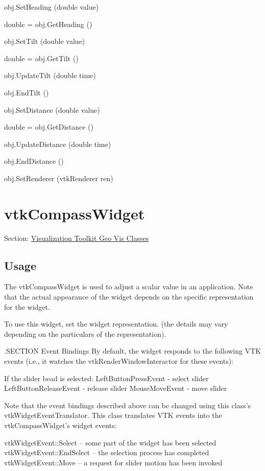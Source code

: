 \begin{DoxyItemize}
\item {\ttfamily obj.\-Set\-Heading (double value)}  
\item {\ttfamily double = obj.\-Get\-Heading ()}  
\item {\ttfamily obj.\-Set\-Tilt (double value)}  
\item {\ttfamily double = obj.\-Get\-Tilt ()}  
\item {\ttfamily obj.\-Update\-Tilt (double time)}  
\item {\ttfamily obj.\-End\-Tilt ()}  
\item {\ttfamily obj.\-Set\-Distance (double value)}  
\item {\ttfamily double = obj.\-Get\-Distance ()}  
\item {\ttfamily obj.\-Update\-Distance (double time)}  
\item {\ttfamily obj.\-End\-Distance ()}  
\item {\ttfamily obj.\-Set\-Renderer (vtk\-Renderer ren)}  
\end{DoxyItemize}\hypertarget{vtkgeovis_vtkcompasswidget}{}\section{vtk\-Compass\-Widget}\label{vtkgeovis_vtkcompasswidget}
Section\-: \hyperlink{sec_vtkgeovis}{Visualization Toolkit Geo Vis Classes} \hypertarget{vtkwidgets_vtkxyplotwidget_Usage}{}\subsection{Usage}\label{vtkwidgets_vtkxyplotwidget_Usage}
The vtk\-Compass\-Widget is used to adjust a scalar value in an application. Note that the actual appearance of the widget depends on the specific representation for the widget.

To use this widget, set the widget representation. (the details may vary depending on the particulars of the representation).

.S\-E\-C\-T\-I\-O\-N Event Bindings By default, the widget responds to the following V\-T\-K events (i.\-e., it watches the vtk\-Render\-Window\-Interactor for these events)\-: 
\begin{DoxyPre}
 If the slider bead is selected:
   LeftButtonPressEvent - select slider 
   LeftButtonReleaseEvent - release slider 
   MouseMoveEvent - move slider
 \end{DoxyPre}


Note that the event bindings described above can be changed using this class's vtk\-Widget\-Event\-Translator. This class translates V\-T\-K events into the vtk\-Compass\-Widget's widget events\-: 
\begin{DoxyPre}
   vtkWidgetEvent::Select -- some part of the widget has been selected
   vtkWidgetEvent::EndSelect -- the selection process has completed
   vtkWidgetEvent::Move -- a request for slider motion has been invoked
 \end{DoxyPre}


